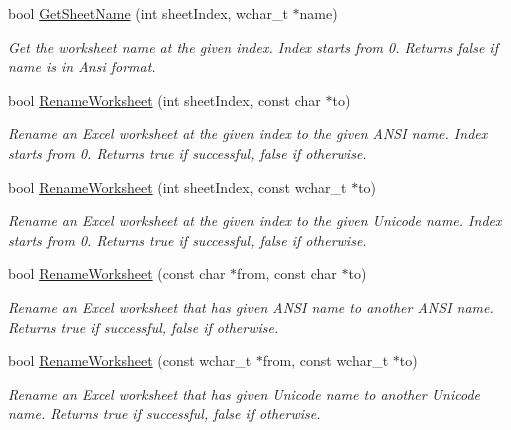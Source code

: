 \begin{DoxyCompactItemize}
bool \hyperlink{class_y_excel_1_1_basic_excel_ac7ccde7ac55faac583344be0bd17d45d}{Get\+Sheet\+Name} (int sheet\+Index, wchar\+\_\+t $\ast$name)
\begin{DoxyCompactList}\small\item\em Get the worksheet name at the given index. Index starts from 0. Returns false if name is in Ansi format. \end{DoxyCompactList}\item 
bool \hyperlink{class_y_excel_1_1_basic_excel_a3d5ec534c692b5db5497a635f068497e}{Rename\+Worksheet} (int sheet\+Index, const char $\ast$to)
\begin{DoxyCompactList}\small\item\em Rename an Excel worksheet at the given index to the given A\+N\+S\+I name. Index starts from 0. Returns true if successful, false if otherwise. \end{DoxyCompactList}\item 
bool \hyperlink{class_y_excel_1_1_basic_excel_a56fe58032e4e985a69f66a61295dbbe0}{Rename\+Worksheet} (int sheet\+Index, const wchar\+\_\+t $\ast$to)
\begin{DoxyCompactList}\small\item\em Rename an Excel worksheet at the given index to the given Unicode name. Index starts from 0. Returns true if successful, false if otherwise. \end{DoxyCompactList}\item 
bool \hyperlink{class_y_excel_1_1_basic_excel_a791f06c754f67e2e010052f65a7f4651}{Rename\+Worksheet} (const char $\ast$from, const char $\ast$to)
\begin{DoxyCompactList}\small\item\em Rename an Excel worksheet that has given A\+N\+S\+I name to another A\+N\+S\+I name. Returns true if successful, false if otherwise. \end{DoxyCompactList}\item 
bool \hyperlink{class_y_excel_1_1_basic_excel_a63323de30c5e426f225d57dac5f243ff}{Rename\+Worksheet} (const wchar\+\_\+t $\ast$from, const wchar\+\_\+t $\ast$to)
\begin{DoxyCompactList}\small\item\em Rename an Excel worksheet that has given Unicode name to another Unicode name. Returns true if successful, false if otherwise. \end{DoxyCompactList}\end{DoxyCompactItemize}
